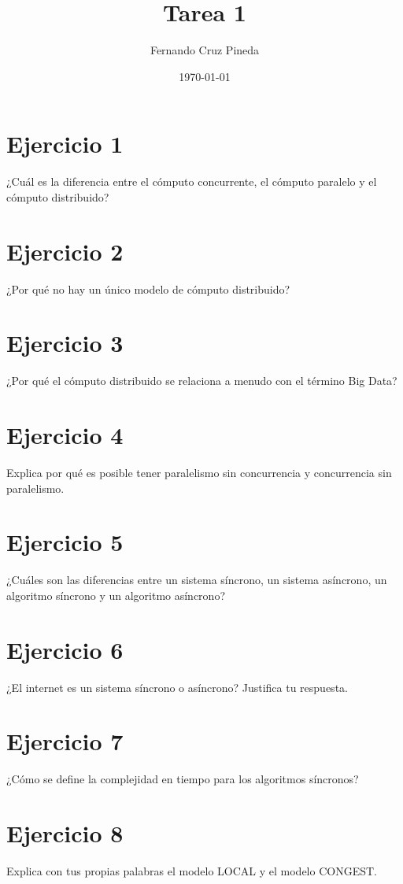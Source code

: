 \documentclass{article}
\title{Tarea 1}
\author{Fernando Cruz Pineda
  \\
  
}
\date{\today}
\begin{document}
\maketitle
\section*{Ejercicio 1}
¿Cuál es la diferencia entre el cómputo concurrente, el cómputo paralelo y el cómputo distribuido?

\section*{Ejercicio 2}
¿Por qué no hay un único modelo de cómputo distribuido?

\section*{Ejercicio 3}
¿Por qué el cómputo distribuido se relaciona a menudo con el término Big Data?

\section*{Ejercicio 4}
Explica por qué es posible tener paralelismo sin concurrencia y concurrencia sin paralelismo.

\section*{Ejercicio 5}
¿Cuáles son las diferencias entre un sistema síncrono, un sistema asíncrono, un algoritmo síncrono y un algoritmo asíncrono?

\section*{Ejercicio 6}
¿El internet es un sistema síncrono o asíncrono? Justifica tu respuesta.

\section*{Ejercicio 7}
¿Cómo se define la complejidad en tiempo para los algoritmos síncronos?

\section*{Ejercicio 8}
Explica con tus propias palabras el modelo LOCAL y el modelo CONGEST.
\end{document}
